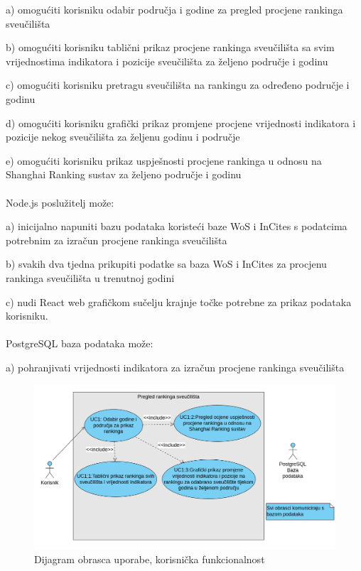 \documentclass[times, utf8, zavrsni]{fer}
\begin{document}
a) omogućiti korisniku odabir područja i godine za pregled procjene rankinga sveučilišta

b) omogućiti korisniku tablični prikaz procjene rankinga sveučilišta sa svim \\vrijednostima indikatora i pozicije sveučilišta za željeno područje i godinu

c) omogućiti korisniku pretragu sveučilišta na rankingu za određeno područje i godinu

d) omogućiti korisniku grafički prikaz  promjene procjene vrijednosti indikatora i pozicije nekog sveučilišta za željenu godinu i područje

e) omogućiti korisniku prikaz uspješnosti procjene rankinga u odnosu na Shanghai Ranking sustav za željeno područje i godinu
\\
\\Node.js poslužitelj može:

a) inicijalno napuniti bazu podataka koristeći baze WoS i InCites s podatcima potrebnim za izračun procjene rankinga sveučilišta

b) svakih dva tjedna prikupiti podatke sa baza WoS i InCites za procjenu rankinga sveučilišta u trenutnoj godini

c) nudi React web grafičkom sučelju krajnje točke potrebne za prikaz podataka korisniku.
\\
\\PostgreSQL baza podataka može:

a) pohranjivati vrijednosti indikatora za izračun procjene rankinga sveučilišta
\\
\begin{figure}[htb]
    
    \includegraphics[scale=0.4]{slika1.png}
    \caption{Dijagram obrasca uporabe, korisnička funkcionalnost}
    \label{fig:korisnik}
    \end{figure}
\newpage
\end{document}
